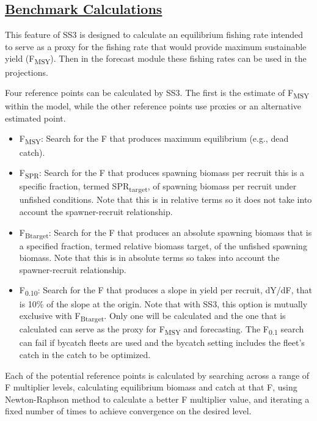 \hypertarget{Benchmark}{}
\subsection[Benchmark Calculations]{\protect\hyperlink{Benchmark}{Benchmark Calculations}}
This feature of SS3 is designed to calculate an equilibrium fishing rate intended to serve as a proxy for the fishing rate that would provide maximum sustainable yield (F\textsubscript{MSY}). Then in the forecast module these fishing rates can be used in the projections.

Four reference points can be calculated by SS3. The first is the estimate of F\textsubscript{MSY} within the model, while the other reference points use proxies or an alternative estimated point.

\begin{itemize}
	\item F\textsubscript{MSY}: Search for the F that produces maximum equilibrium (e.g., dead catch).
	
	\item F\textsubscript{SPR}: Search for the F that produces spawning biomass per recruit this is a specific fraction, termed SPR\textsubscript{target}, of spawning biomass per recruit under unfished conditions. Note that this is in relative terms so it does not take into account the spawner-recruit relationship.
	
	\item F\textsubscript{Btarget}: Search for the F that produces an absolute spawning biomass that is a specified fraction, termed relative biomass target, of the unfished spawning biomass. Note that this is in absolute terms so takes into account the spawner-recruit relationship. 
	
	\item F\textsubscript{0.10}: Search for the F that produces a slope in yield per recruit, dY/dF, that is 10\% of the slope at the origin. Note that with SS3, this option is mutually exclusive with F\textsubscript{Btarget}. Only one will be calculated and the one that is calculated can serve as the proxy for F\textsubscript{MSY} and forecasting. The F\textsubscript{0.1} search can fail if bycatch fleets are used and the bycatch setting includes the fleet's catch in the catch to be optimized.
\end{itemize}

Each of the potential reference points is calculated by searching across a range of F multiplier levels, calculating equilibrium biomass and catch at that F, using Newton-Raphson method to calculate a better F multiplier value, and iterating a fixed number of times to achieve convergence on the desired level.

